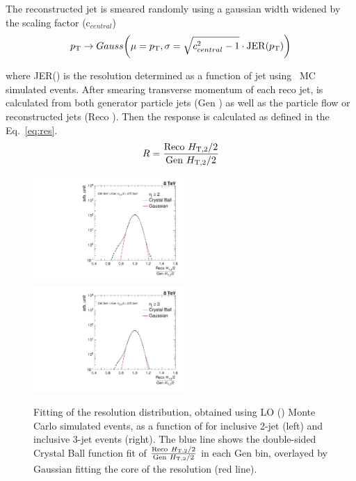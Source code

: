 The reconstructed jet \pt is smeared randomly using a gaussian width widened by the scaling factor (c$_{central}$) 
\begin{equation}
p_{\mathrm{T}} \rightarrow Gauss\bigg(\mu = p_{\mathrm{T}}, \sigma = \sqrt{c^2_{central} - 1} \cdot {\rm JER}(p_{\mathrm{T}})\bigg)
\end{equation}

where JER(\pt) is the resolution determined as a function of jet \pt using \MGP~MC simulated events. After smearing transverse momentum of each reco jet, \httwo is calculated from both generator particle jets (Gen \httwons) as well as the particle flow or reconstructed jets (Reco \httwons). Then the response is calculated as defined in the Eq.~\ref{eq:res}. 
\begin{equation}
\label{eq:res}
  R = \frac{{\rm Reco}~\httwo}{{\rm Gen}~\httwo}
\end{equation}

\begin{figure}[ht]
  \begin{center}
   \hspace*{-5mm}\includegraphics[width=0.51\textwidth]{Plots_HT_2_150/Fit_Res_2_final_crystal_genbin_250-275_crystal_nomet.pdf}%
    ~~\includegraphics[width=0.51\textwidth]{Plots_HT_2_150/Fit_Res_3_final_crystal_genbin_250-275_crystal_nomet.pdf}
    \caption{Fitting of the resolution distribution, obtained using LO \MadGraphF \plus \PYTHIAS (\MGP) Monte Carlo simulated events, as a function of \httwo for inclusive 2-jet (left) and inclusive 3-jet events (right). The blue line shows the double-sided Crystal Ball function fit of $\frac{{\rm Reco}~\httwo}{{\rm Gen}~\httwo}$ in each Gen \httwo bin, overlayed by Gaussian fitting the core of the resolution (red line).}
    \label{fig:fit_gauss}
  \end{center}
\end{figure}

